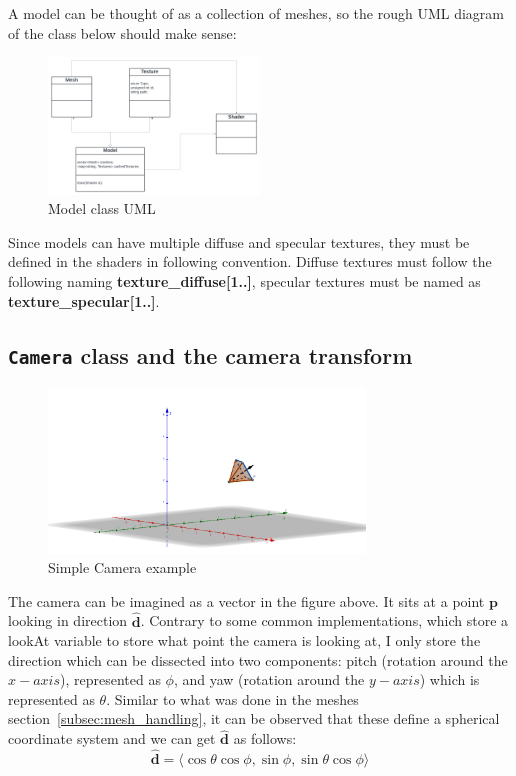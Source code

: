 A model can be thought of as a collection of meshes, so the rough UML diagram of the class below should make sense:
\begin{figure}[H]
    \centering
    \includegraphics[width=0.5\textwidth]{images/model_uml.png}
    \caption{Model class UML}
    \label{fig:model_uml}
\end{figure}

Since models can have multiple diffuse and specular textures, they must be defined in the shaders in following convention. Diffuse textures must follow the following naming \textbf{texture\_diffuse[1..]}, specular textures must be named as \textbf{texture\_specular[1..]}.


\subsection{\texttt{Camera} class and the camera transform}

\begin{figure}[H]
    \centering
    \includegraphics[width=0.75\textwidth]{images/camera_eg2.png}
    \caption{Simple Camera example}
    \label{fig:camera_eg}
\end{figure}

The camera can be imagined as a vector in the figure above. It sits at a point $\mathbf{p}$ looking in direction {$\mathbf{\hat{d}}$}. Contrary to some common implementations, which store a lookAt variable to store what point the camera is looking at, I only store the direction which can be dissected into two components: pitch (rotation around the $x-axis$), represented as $\phi$, and yaw (rotation around the $y-axis$) which is represented as $\theta$. Similar to what was done in the meshes section~\ref{subsec:mesh_handling}, it can be observed that these define a spherical coordinate system and we can get $\mathbf{\hat{d}}$ as follows: \begin{equation}\mathbf{\hat{d}} = \langle \cos\theta\cos\phi, \sin\phi, \sin\theta\cos\phi \rangle\end{equation}

